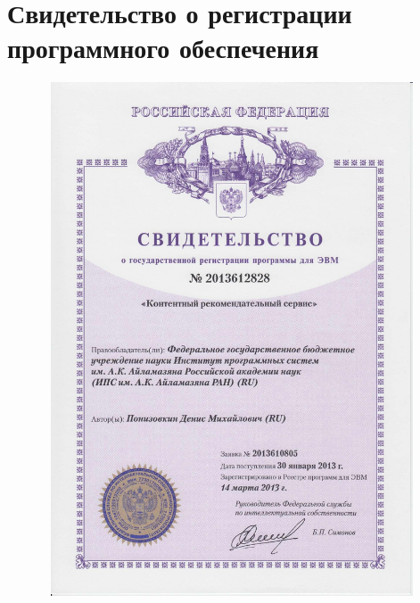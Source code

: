 \chapter{Свидетельство о регистрации программного обеспечения}
\begin{figure}[H]
  \begin{center}
  \includegraphics[width=6in,height=6in]{pics/svidetelstvo}
	\end{center}
\end{figure}

